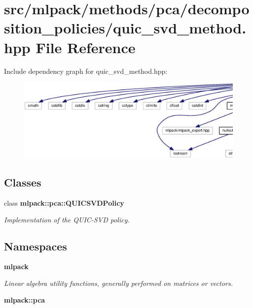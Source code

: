 \section{src/mlpack/methods/pca/decomposition\+\_\+policies/quic\+\_\+svd\+\_\+method.hpp File Reference}
\label{quic__svd__method_8hpp}
Include dependency graph for quic\+\_\+svd\+\_\+method.\+hpp\+:
\nopagebreak
\begin{figure}[H]
\begin{center}
\leavevmode
\includegraphics[width=350pt]{quic__svd__method_8hpp__incl}
\end{center}
\end{figure}
\subsection*{Classes}
\begin{DoxyCompactItemize}
\item 
class {\bf mlpack\+::pca\+::\+Q\+U\+I\+C\+S\+V\+D\+Policy}
\begin{DoxyCompactList}\small\item\em Implementation of the Q\+U\+I\+C-\/\+S\+VD policy. \end{DoxyCompactList}\end{DoxyCompactItemize}
\subsection*{Namespaces}
\begin{DoxyCompactItemize}
\item 
 {\bf mlpack}
\begin{DoxyCompactList}\small\item\em Linear algebra utility functions, generally performed on matrices or vectors. \end{DoxyCompactList}\item 
 {\bf mlpack\+::pca}
\end{DoxyCompactItemize}


